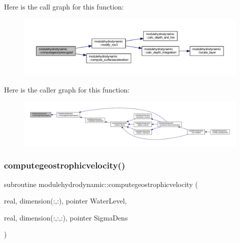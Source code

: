 Here is the call graph for this function\+:\nopagebreak
\begin{figure}[H]
\begin{center}
\leavevmode
\includegraphics[width=350pt]{namespacemodulehydrodynamic_a8db443c5e63483726ac4ce8b9729bbfa_cgraph}
\end{center}
\end{figure}
Here is the caller graph for this function\+:\nopagebreak
\begin{figure}[H]
\begin{center}
\leavevmode
\includegraphics[width=350pt]{namespacemodulehydrodynamic_a8db443c5e63483726ac4ce8b9729bbfa_icgraph}
\end{center}
\end{figure}
\mbox{\label{namespacemodulehydrodynamic_a63098393e35b164bc5c6885e1473058f}} 
\subsubsection{\texorpdfstring{computegeostrophicvelocity()}{computegeostrophicvelocity()}}
{\footnotesize\ttfamily subroutine modulehydrodynamic\+::computegeostrophicvelocity (\begin{DoxyParamCaption}\item[{real, dimension(\+:,\+:), pointer}]{Water\+Level,  }\item[{real, dimension(\+:,\+:,\+:), pointer}]{Sigma\+Dens }\end{DoxyParamCaption})\hspace{0.3cm}{\ttfamily [private]}}

